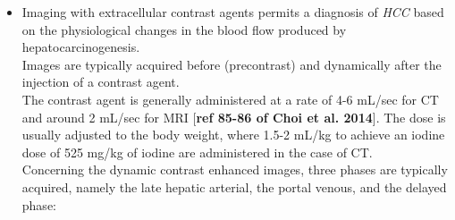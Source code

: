 \documentclass[]{article}
\begin{document}
\begin{itemize}
\item
  Imaging with extracellular contrast agents permits a diagnosis of
  \emph{HCC} based on the physiological changes in the blood flow
  produced by hepatocarcinogenesis.\\
  Images are typically acquired before (precontrast) and dynamically
  after the injection of a contrast agent.\\
  The contrast agent is generally administered at a rate of 4-6 mL/sec
  for CT and around 2 mL/sec for MRI {[}\textbf{ref 85-86 of Choi et al.
  2014}{]}. The dose is usually adjusted to the body weight, where 1.5-2
  mL/kg to achieve an iodine dose of 525 mg/kg of iodine are
  administered in the case of CT.\\
  Concerning the dynamic contrast enhanced images, three phases are
  typically acquired, namely the late hepatic arterial, the portal
  venous, and the delayed phase:


\end{itemize}
\end{document}
